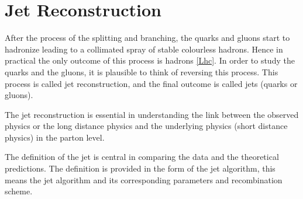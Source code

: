\chapter{Jet Reconstruction}

After the process of the splitting and branching, the quarks and gluons start to hadronize leading to a collimated spray of stable colourless hadrons. Hence in practical the only outcome of this process is hadrons \ref{Lhc}. In order to study the quarks and the gluons, it is plausible to think of reversing this process. This process is called jet reconstruction, and the final outcome is called jets (quarks or gluons).     

The jet reconstruction is essential in understanding the link between the observed physics or the long distance physics and the underlying physics (short distance physics) in the parton level.

The definition of the jet is central in comparing the data and the theoretical predictions. The definition is provided in the form of the jet algorithm, this means the jet algorithm and its corresponding parameters and recombination scheme.






    

